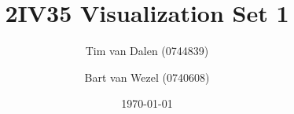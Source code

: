 \documentclass[a4paper,11pt]{article}
\title{
	2IV35 Visualization Set 1 \\
}
\author{
	Tim van Dalen (0744839)
	\and
	Bart van Wezel (0740608)
}
\date{\today}
\begin{document}
	\maketitle

	

	

	

	

	
	
	\newpage
	\begin{appendix}
	\label{City}
	\end{appendix}
\end{document}
